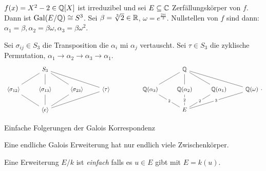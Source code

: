 \begin{eg}
	$f(x) = X^2-2 \in \mathbb{Q}[X]$ ist irreduzibel und sei $E \subseteq \mathbb{C}$ Zerfällungskörper von $f$.
	Dann ist $\operatorname{Gal}(E / \mathbb{Q}) \cong S^{3}$.
	Sei $\beta = \sqrt[3]{2} \in \mathbb{R}$, $\omega = e^{\frac{2 \pi i }{3}}$.
	Nullstellen von $f$ sind dann: $\alpha_1 = \beta, \alpha_2 = \beta \omega, \alpha_3 = \beta \omega^2$.
	
	Sei $\sigma_{ij} \in S_{3}$ die Transposition die $\alpha_{i}$ mi $\alpha_{j}$ vertauscht.
	Sei $\tau \in S_3$ die zyklische Permutation, $\alpha_1 \to \alpha_2 \to \alpha_3 \to \alpha_1$.
	\[
	\begin{tikzcd}
                                               & S_3 \arrow[ld, no head] \arrow[d, no head] \arrow[rd, no head] \arrow[rrd, no head] &                                                &                                          &  &                                                   & \Q \arrow[d, no head] \arrow[rd, no head] \arrow[rrd, no head] \arrow[ld, no head] &                                                   &                                                  \\
\langle \sigma_{12}\rangle \arrow[rd, no head] & \langle \sigma_{13}\rangle \arrow[d, no head]                                       & \langle \sigma_{23}\rangle \arrow[ld, no head] & \langle \tau\rangle \arrow[lld, no head] &  & \Q(\alpha_3) \arrow[rd, "2" description, no head] & \Q(\alpha_2) \arrow[d, "2" description, no head]                                   & \Q(\alpha_1) \arrow[ld, "2" description, no head] & \Q(\omega) \arrow[lld, "3" description, no head] \\
                                               & \langle e\rangle                                                                    &                                                &                                          &  &                                                   & E                                                                                  &                                                   &                                                 
\end{tikzcd}
	.\] 
\end{eg}

Einfache Folgerungen der Galois Korrespondenz
\begin{corollary}
	Eine endliche Galois Erweiterung hat nur endlich viele Zwischenkörper.
\end{corollary}

\begin{definition}
	Eine Erweiterung $E / k$ ist \emph{einfach} falls es $u \in E$ gibt mit $E = k(u)$.
\end{definition}

